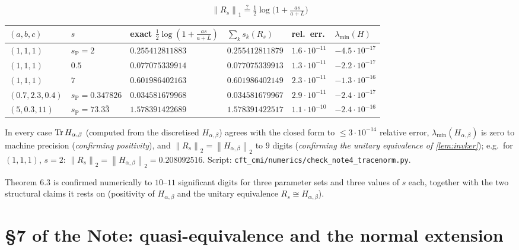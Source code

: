 \documentclass[11pt]{article}
\newcommand{\norm}[1]{\left\lVert #1\right\rVert}
\begin{document}
\begin{equation}\label{eq:trnorm}
 \norm{R_s}_1\overset{?}{=}\tfrac12\log\bigl(1+\tfrac{as}{a+L}\bigr)
\end{equation}

\begin{center}\small
\begin{tabular}{llllll}
\toprule
$(a,b,c)$ & $s$ & exact $\frac12\log(1+\frac{as}{a+L})$ & $\sum_ks_k(R_s)$ &
 rel.\ err. & $\lambda_{\min}(H)$\\
\midrule
$(1,1,1)$ & $s_{\mathrm P}=2$ & $0.255412811883$ & $0.255412811879$ & $1.6\cdot10^{-11}$ & $-4.5\cdot10^{-17}$\\
$(1,1,1)$ & $0.5$ & $0.077075339914$ & $0.077075339913$ & $1.3\cdot10^{-11}$ & $-2.2\cdot10^{-17}$\\
$(1,1,1)$ & $7$ & $0.601986402163$ & $0.601986402149$ & $2.3\cdot10^{-11}$ & $-1.3\cdot10^{-16}$\\
$(0.7,2.3,0.4)$ & $s_{\mathrm P}=0.347826$ & $0.034581679968$ & $0.034581679967$ & $2.9\cdot10^{-11}$ & $-2.4\cdot10^{-17}$\\
$(5,0.3,11)$ & $s_{\mathrm P}=73.3\overline3$ & $1.578391422689$ & $1.578391422517$ & $1.1\cdot10^{-10}$ & $-2.4\cdot10^{-16}$\\
\bottomrule
\end{tabular}
\end{center}

In every case $\operatorname{Tr} H_{\alpha,\beta}$ (computed from the discretised
$H_{\alpha,\beta}$) agrees with the closed form to $\le3\cdot10^{-14}$
relative error, $\lambda_{\min}(H_{\alpha,\beta})$ is zero to machine
precision (\emph{confirming positivity}), and
$\norm{R_s}_2=\norm{H_{\alpha,\beta}}_2$ to $9$ digits (\emph{confirming the
unitary equivalence of \cref{lem:invker}}); e.g.\ for $(1,1,1)$, $s=2$:
$\norm{R_s}_2=\norm{H_{\alpha,\beta}}_2=0.208092516$.
Script: \texttt{cft\_cmi/numerics/check\_note4\_tracenorm.py}.

\begin{verdictok}
Theorem 6.3 is confirmed numerically to $10$--$11$ significant digits for three
parameter sets and three values of $s$ each, together with the two structural
claims it rests on (positivity of $H_{\alpha,\beta}$ and the unitary
equivalence $R_s\cong H_{\alpha,\beta}$).
\end{verdictok}

\section{\S7 of the Note: quasi-equivalence and the normal extension}\label{sec:seven}
\end{document}
